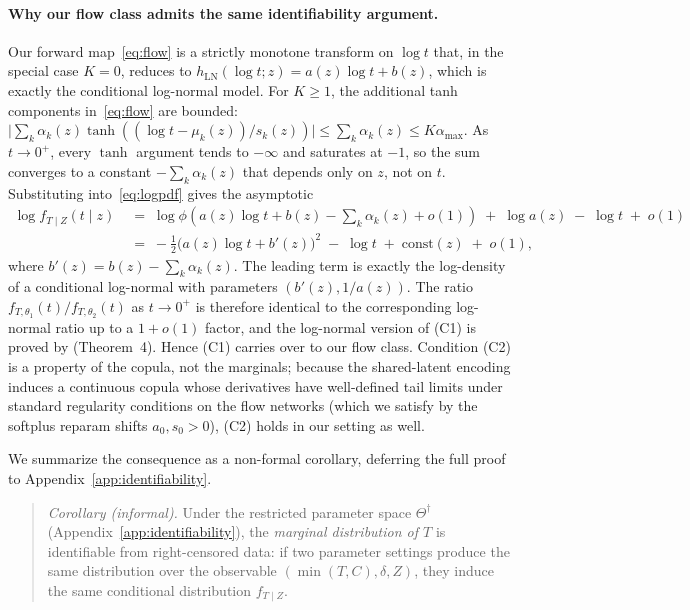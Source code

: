 \paragraph{Why our flow class admits the same identifiability argument.}
Our forward map~\eqref{eq:flow} is a strictly monotone transform on
$\log t$ that, in the special case $K = 0$, reduces to
$h_{\text{LN}}(\log t; z) = a(z) \log t + b(z)$, which is exactly the
conditional log-normal model. For $K \ge 1$, the additional tanh components
in~\eqref{eq:flow} are bounded:
$\big|\sum_k \alpha_k(z) \tanh((\log t - \mu_k(z)) / s_k(z))\big|
\le \sum_k \alpha_k(z) \le K \alpha_{\max}$.
As $t \to 0^+$, every $\tanh$ argument tends to $-\infty$ and saturates at
$-1$, so the sum converges to a constant
$-\sum_k \alpha_k(z)$ that depends only on $z$, not on $t$. Substituting
into~\eqref{eq:logpdf} gives the asymptotic
\begin{align*}
    \log f_{T \mid Z}(t \mid z)
    &\;=\; \log \phi\!\left(a(z) \log t + b(z) - \textstyle\sum_k \alpha_k(z) + o(1)\right)
    \;+\; \log a(z) \;-\; \log t \;+\; o(1) \\
    &\;=\; -\tfrac{1}{2}\big(a(z) \log t + b'(z)\big)^2 \;-\; \log t \;+\; \mathrm{const}(z) \;+\; o(1),
\end{align*}
where $b'(z) = b(z) - \sum_k \alpha_k(z)$. The leading term is exactly the
log-density of a conditional log-normal with parameters $(b'(z), 1/a(z))$.
The ratio $f_{T, \theta_1}(t) / f_{T, \theta_2}(t)$ as $t \to 0^+$ is
therefore identical to the corresponding log-normal ratio up to a $1 + o(1)$
factor, and the log-normal version of (C1) is proved by
\citet{czado2023dependent} (Theorem~4). Hence (C1) carries over to our
flow class. Condition (C2) is a property of the copula, not the marginals;
because the shared-latent encoding induces a continuous copula whose
derivatives have well-defined tail limits under standard regularity
conditions on the flow networks (which we satisfy by the softplus reparam
shifts $a_0, s_0 > 0$), (C2) holds in our setting as well.

We summarize the consequence as a non-formal corollary, deferring the full
proof to Appendix~\ref{app:identifiability}.

\begin{quote}
\textit{Corollary (informal).}
Under the restricted parameter space $\Theta^\dagger$
(Appendix~\ref{app:identifiability}), the \emph{marginal distribution of
$T$} is identifiable from right-censored data: if two parameter settings
produce the same distribution over the observable $(\min(T, C), \delta, Z)$,
they induce the same conditional distribution $f_{T \mid Z}$.
\end{quote}

